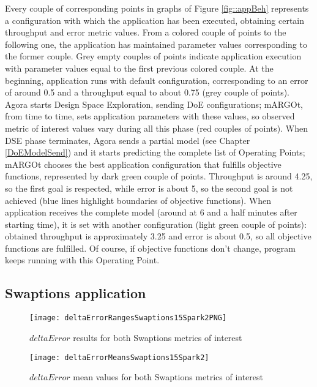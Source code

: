 Every couple of corresponding points in graphs of Figure \ref{fig::appBeh} represents a configuration with which the application has been executed, obtaining certain throughput and error metric values. From a colored couple of points to the following one, the application has maintained parameter values corresponding to the former couple. Grey empty couples of points indicate application execution with parameter values equal to the first previous colored couple. At the beginning, application runs with default configuration, corresponding to an error of around 0.5 and a throughput equal to about 0.75 (grey couple of points). Agora starts Design Space Exploration, sending DoE configurations; mARGOt, from time to time, sets application parameters with these values, so observed metric of interest values vary during all this phase (red couples of points). When DSE phase terminates, Agora sends a partial model (see Chapter \ref{DoEModelSend}) and it starts predicting the complete list of Operating Points; mARGOt chooses the best application configuration that fulfills objective functions, represented by dark green couple of points. Throughput is around 4.25, so the first goal is respected, while error is about 5, so the second goal is not achieved (blue lines highlight boundaries of objective functions). When application receives the complete model (around at 6 and a half minutes after starting time), it is set with another configuration (light green couple of points): obtained throughput is approximately 3.25 and error is about 0.5, so all objective functions are fulfilled. Of course, if objective functions don't change, program keeps running with this Operating Point.





\subsection{Swaptions application}

\begin{figure}[htb]

    \centering
    \texttt{[image: deltaErrorRangesSwaptions15Spark2PNG]}
    \caption{$deltaError$ results for both Swaptions metrics of interest}
    \label{fig::swaptions15spark2::intervals}
    
\end{figure}

\begin{figure}[htb]

    \centering
    \texttt{[image: deltaErrorMeansSwaptions15Spark2]}
    \caption{$deltaError$ mean values for both Swaptions metrics of interest}
    \label{fig::swaptions15spark2::means}
    
\end{figure}	

